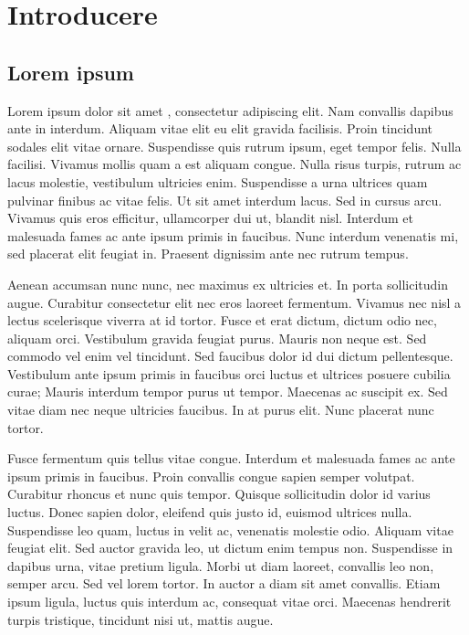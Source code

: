 \chapter{Introducere}

\section{Lorem ipsum}

Lorem ipsum dolor sit amet , consectetur adipiscing elit. Nam convallis dapibus ante in interdum. Aliquam vitae elit eu elit gravida facilisis. Proin tincidunt sodales elit vitae ornare. Suspendisse quis rutrum ipsum, eget tempor felis. Nulla facilisi. Vivamus mollis quam a est aliquam congue. Nulla risus turpis, rutrum ac lacus molestie, vestibulum ultricies enim. Suspendisse a urna ultrices quam pulvinar finibus ac vitae felis. Ut sit amet interdum lacus. Sed in cursus arcu. Vivamus quis eros efficitur, ullamcorper dui ut, blandit nisl. Interdum et malesuada fames ac ante ipsum primis in faucibus. Nunc interdum venenatis mi, sed placerat elit feugiat in. Praesent dignissim ante nec rutrum tempus.

Aenean accumsan nunc nunc, nec maximus ex ultricies et. In porta sollicitudin augue. Curabitur consectetur elit nec eros laoreet fermentum. Vivamus nec nisl a lectus scelerisque viverra at id tortor. Fusce et erat dictum, dictum odio nec, aliquam orci. Vestibulum gravida feugiat purus. Mauris non neque est. Sed commodo vel enim vel tincidunt. Sed faucibus dolor id dui dictum pellentesque. Vestibulum ante ipsum primis in faucibus orci luctus et ultrices posuere cubilia curae; Mauris interdum tempor purus ut tempor. Maecenas ac suscipit ex. Sed vitae diam nec neque ultricies faucibus. In at purus elit. Nunc placerat nunc tortor.

Fusce fermentum quis tellus vitae congue. Interdum et malesuada fames ac ante ipsum primis in faucibus. Proin convallis congue sapien semper volutpat. Curabitur rhoncus et nunc quis tempor. Quisque sollicitudin dolor id varius luctus. Donec sapien dolor, eleifend quis justo id, euismod ultrices nulla. Suspendisse leo quam, luctus in velit ac, venenatis molestie odio. Aliquam vitae feugiat elit. Sed auctor gravida leo, ut dictum enim tempus non. Suspendisse in dapibus urna, vitae pretium ligula. Morbi ut diam laoreet, convallis leo non, semper arcu. Sed vel lorem tortor. In auctor a diam sit amet convallis. Etiam ipsum ligula, luctus quis interdum ac, consequat vitae orci. Maecenas hendrerit turpis tristique, tincidunt nisi ut, mattis augue.

